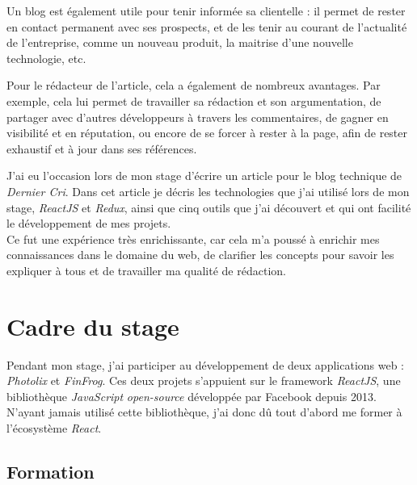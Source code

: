 \documentclass[12pt,a4paper]{article}
\begin{document}
  \bigskip

  Un blog est également utile pour tenir informée sa clientelle : il
  permet de rester en contact permanent avec ses prospects, et de les
  tenir au courant de l'actualité de l'entreprise, comme un nouveau
  produit, la maitrise d'une nouvelle technologie, etc.

  \bigskip

  Pour le rédacteur de l'article, cela a également de nombreux avantages.
  Par exemple, cela lui permet de travailler sa rédaction et son
  argumentation, de partager avec d'autres développeurs à travers les
  commentaires, de gagner en visibilité et en réputation, ou encore de se
  forcer à rester à la page, afin de rester exhaustif et à jour dans ses
  références.

  \bigskip

  J'ai eu l'occasion lors de mon stage d'écrire un article pour le blog
  technique de \emph{Dernier Cri}. Dans cet article je décris les
  technologies que j'ai utilisé lors de mon stage, \emph{ReactJS} et
  \emph{Redux}, ainsi que cinq outils que j'ai découvert et qui ont
  facilité le développement de mes projets.\\
  Ce fut une expérience très enrichissante, car cela m'a poussé à enrichir
  mes connaissances dans le domaine du web, de clarifier les concepts pour
  savoir les expliquer à tous et de travailler ma qualité de rédaction.

  \newpage

  \section{Cadre du stage}\label{cadre-du-stage}

  \bigskip

  Pendant mon stage, j'ai participer au développement de deux applications
  web : \emph{Photolix} et \emph{FinFrog}. Ces deux projets s'appuient sur
  le framework \emph{ReactJS}, une bibliothèque \emph{JavaScript}
  \emph{open-source} développée par Facebook depuis 2013. N'ayant jamais
  utilisé cette bibliothèque, j'ai donc dû tout d'abord me former à
  l'écosystème \emph{React}.

  \bigskip

  \subsection{Formation}\label{formation}

  \bigskip
\end{document}
